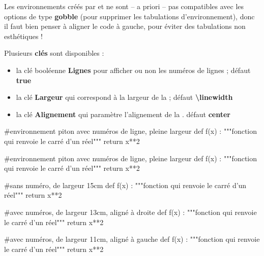 \documentclass{article}
\newcommand\ctex[1]{\tcbox[vignettelatex]{#1}}
\newcommand\Cle[1]{{\bfseries\sffamily\textlangle #1\textrangle}}
\begin{document}
\begin{codeattention}
Les environnements créés par \ctex{piton} et \ctex{tcolorbox} ne sont -- a priori -- pas compatibles avec les options de type \Cle{gobble} (pour supprimer les tabulations d'environnement), donc il faut bien penser à \og aligner \fg{} le code à gauche, pour éviter des tabulations non esthétiques !
\end{codeattention}

\begin{codecles}
Plusieurs \Cle{clés} sont disponibles :

\begin{itemize}
	\item la clé booléenne \Cle{Lignes} pour afficher ou non les numéros de lignes ; \hfill{}défaut \Cle{true}
	\item la clé \Cle{Largeur} qui correspond à la largeur de la \ctex{tcbox} ; \hfill{}défaut \Cle{\textbackslash linewidth}
	\item la clé \Cle{Alignement} qui paramètre l'alignement de la \ctex{tcbox}. \hfill{}défaut \Cle{center}
\end{itemize}
\end{codecles}

\begin{codetex}
\begin{envcodepiton}
#environnement piton avec numéros de ligne, pleine largeur
def f(x) :
	"""fonction qui renvoie le carré d'un réel"""
	return x**2
\end{envcodepiton}
\end{codetex}

\begin{codesortie}
\begin{envcodepiton}
#environnement piton avec numéros de ligne, pleine largeur
def f(x) :
	"""fonction qui renvoie le carré d'un réel"""
	return x**2
\end{envcodepiton}
\end{codesortie}

\pagebreak

\begin{codetex}
\begin{envcodepiton}[Lignes=false,Largeur=15cm]
#sans numéro, de largeur 15cm
def f(x) :
	"""fonction qui renvoie le carré d'un réel"""
	return x**2
\end{envcodepiton}

\begin{envcodepiton}[Alignement=flush right,Largeur=13cm]
#avec numéros, de largeur 13cm, aligné à droite
def f(x) :
	"""fonction qui renvoie le carré d'un réel"""
	return x**2
\end{envcodepiton}

\begin{envcodepiton}[Alignement=flush left,Largeur=11cm]
#avec numéros, de largeur 11cm, aligné à gauche
def f(x) :
	"""fonction qui renvoie le carré d'un réel"""
	return x**2
\end{envcodepiton}
\end{codetex}
\end{document}

